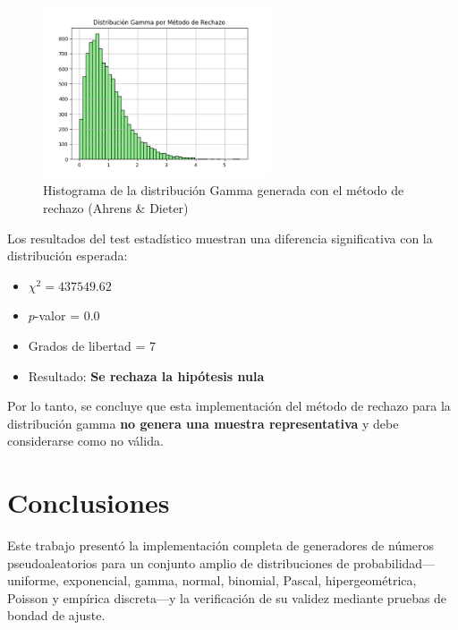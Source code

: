 \documentclass[11pt]{article}
\begin{document}
\begin{figure}[H]
    \centering
    \includegraphics[width=0.6\textwidth]{Images/gamma_rechazo.png}
    \caption{Histograma de la distribución Gamma generada con el método de rechazo (Ahrens \& Dieter)}
\end{figure}

Los resultados del test estadístico muestran una diferencia significativa con la distribución esperada:

\begin{itemize}
    \item $\chi^2 = 437549.62$
    \item $p$-valor = 0.0
    \item Grados de libertad = 7
    \item Resultado: \textbf{Se rechaza la hipótesis nula}
\end{itemize}

Por lo tanto, se concluye que esta implementación del método de rechazo para la distribución gamma \textbf{no genera una muestra representativa} y debe considerarse como no válida.
\section{Conclusiones}

Este trabajo presentó la implementación completa de generadores de números pseudoaleatorios
para un conjunto amplio de distribuciones de probabilidad—uniforme, exponencial, gamma,
normal, binomial, Pascal, hipergeométrica, Poisson y empírica discreta—y la verificación de su
validez mediante pruebas de bondad de ajuste.
\end{document}
